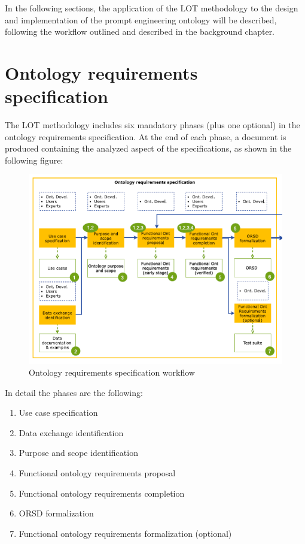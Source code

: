 In the following sections, the application of the LOT methodology to the design and implementation of the prompt engineering ontology will be described, following the workflow outlined and described in the background chapter.

\newpage

\section{Ontology requirements specification}
The LOT methodology includes six mandatory phases (plus one optional) in the ontology requirements specification. At the end of each phase, a document is produced containing the analyzed aspect of the specifications, as shown in the following figure:
\begin{figure}[H]
    \centering
    \includegraphics[width=0.9\linewidth]{Figures/fig_13.PNG}
    \caption{Ontology requirements specification workflow}
    \label{fig:enter-label}
\end{figure}
In detail the phases are the following:
\begin{enumerate}
    \item Use case specification
    \item Data exchange identification
    \item Purpose and scope identification
    \item Functional ontology requirements proposal
    \item Functional ontology requirements completion
    \item ORSD formalization 
    \item Functional ontology requirements formalization (optional)
\end{enumerate}

